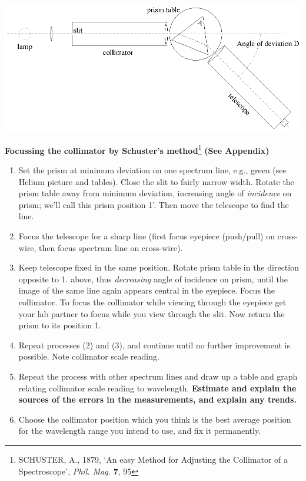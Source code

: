 \documentclass[12pt]{article}
\begin{document}
\begin{center}
\includegraphics{ap3labspec1.ps}
\end{center}

{\large {\bf Focussing the collimator by Schuster's method}\footnote{SCHUSTER, A., 1879, `An easy Method for Adjusting the Collimator of a Spectroscope',  {\sl Phil. Mag.} {\bf 7}, 95} {\bf (See Appendix)}}

\begin{enumerate}
\item Set the prism at minimum deviation on one spectrum line, e.g., green (see Helium picture and tables).  Close the slit to fairly narrow width. Rotate the prism table away from minimum deviation, increasing angle of {\em incidence} on  prism; we'll call this prism position 1'. Then move the telescope to find the line.

\item Focus the telescope for a sharp line (first focus eyepiece (push/pull) on cross-wire, then  focus spectrum line on cross-wire).

\item Keep telescope fixed in the same position. Rotate prism table in the direction opposite to 1. above, thus {\em decreasing\/} angle of incidence on  prism, until the image of the same line again appears central in the eyepiece.  Focus the collimator.  To focus the collimator while viewing through the eyepiece get your lab partner to focus while you view through the slit. Now return the prism to its position 1. 

\item Repeat processes (2) and (3), and continue until no further improvement is possible.   Note collimator scale reading.

\item Repeat the process with other spectrum lines and draw up a table and graph relating collimator scale reading to wavelength. {\bf Estimate and explain the sources of the errors in the measurements, and explain any trends.}

\item Choose the collimator position which you think is the best average position for the  wavelength range you intend to use, and fix it permanently.
\end{enumerate}
\end{document}
